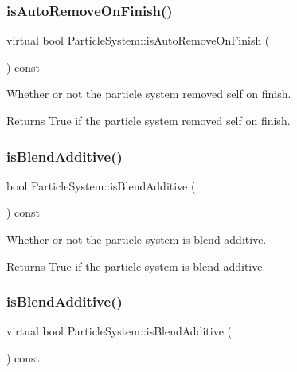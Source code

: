 \subsubsection{\texorpdfstring{is\+Auto\+Remove\+On\+Finish()}{isAutoRemoveOnFinish()}\hspace{0.1cm}{\footnotesize\ttfamily [2/2]}}
{\footnotesize\ttfamily virtual bool Particle\+System\+::is\+Auto\+Remove\+On\+Finish (\begin{DoxyParamCaption}{ }\end{DoxyParamCaption}) const\hspace{0.3cm}{\ttfamily [virtual]}}

Whether or not the particle system removed self on finish.

\begin{DoxyReturn}{Returns}
True if the particle system removed self on finish. 
\end{DoxyReturn}
\mbox{\label{classParticleSystem_a8d4f177ef491130b85b55766326d9bee}} 
\subsubsection{\texorpdfstring{is\+Blend\+Additive()}{isBlendAdditive()}\hspace{0.1cm}{\footnotesize\ttfamily [1/2]}}
{\footnotesize\ttfamily bool Particle\+System\+::is\+Blend\+Additive (\begin{DoxyParamCaption}{ }\end{DoxyParamCaption}) const\hspace{0.3cm}{\ttfamily [virtual]}}

Whether or not the particle system is blend additive.

\begin{DoxyReturn}{Returns}
True if the particle system is blend additive. 
\end{DoxyReturn}
\mbox{\label{classParticleSystem_ad6a2245364fcfa548699231e5cc93d3f}} 
\subsubsection{\texorpdfstring{is\+Blend\+Additive()}{isBlendAdditive()}\hspace{0.1cm}{\footnotesize\ttfamily [2/2]}}
{\footnotesize\ttfamily virtual bool Particle\+System\+::is\+Blend\+Additive (\begin{DoxyParamCaption}{ }\end{DoxyParamCaption}) const\hspace{0.3cm}{\ttfamily [virtual]}}


